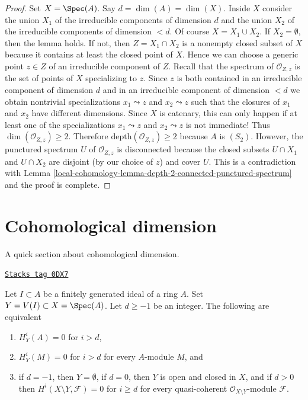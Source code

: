 \begin{proof}
Set $X = \Spec(A)$. Say $d = \dim(A) = \dim(X)$. Inside $X$ consider the
union $X_1$ of the irreducible components of dimension $d$ and the union
$X_2$ of the irreducible components of dimension $< d$. Of course
$X = X_1 \cup X_2$. If $X_2 = \emptyset$,
then the lemma holds. If not, then $Z = X_1 \cap X_2$ is a nonempty closed
subset of $X$ because it contains at least the closed point of $X$.
Hence we can choose a generic point $z \in Z$ of an irreducible component
of $Z$. Recall that the spectrum of $\mathcal{O}_{Z, z}$ is the set of points
of $X$ specializing to $z$. Since $z$ is both contained in an
irreducible component of dimension $d$ and in an irreducible component
of dimension $< d$ we obtain nontrivial specializations $x_1 \leadsto z$ and
$x_2 \leadsto z$ such that the closures of $x_1$ and $x_2$ have different
dimensions. Since $X$ is catenary, this can only happen if at least
one of the specializations $x_1 \leadsto z$ and $x_2 \leadsto z$ is not
immediate! Thus $\dim(\mathcal{O}_{Z, z}) \geq 2$. Therefore
$\text{depth}(\mathcal{O}_{Z, z}) \geq 2$ because $A$ is $(S_2)$.
However, the punctured spectrum $U$ of $\mathcal{O}_{Z, z}$ is disconnected
because the closed subsets $U \cap X_1$ and $U \cap X_2$ are disjoint
(by our choice of $z$) and cover $U$. This is a contradiction with
Lemma \ref{local-cohomology-lemma-depth-2-connected-punctured-spectrum}
and the proof is complete.
\end{proof}

\section{Cohomological dimension}
\label{local-cohomology-section-cd}
A quick section about cohomological dimension.

\begin{lemma}[Cd]
\label{local-cohomology-lemma-cd}
\href{https://stacks.math.columbia.edu/tag/0DX7}{\texttt{Stacks tag 0DX7}}

Let $I \subset A$ be a finitely generated ideal of a ring $A$.
Set $Y = V(I) \subset X = \Spec(A)$. Let $d \geq -1$ be an integer.
The following are equivalent
\begin{enumerate}
\item $H^i_Y(A) = 0$ for $i > d$,
\item $H^i_Y(M) = 0$ for $i > d$ for every $A$-module $M$, and
\item if $d = -1$, then $Y = \emptyset$, if $d = 0$, then
$Y$ is open and closed in $X$, and if $d > 0$ then
$H^i(X \setminus Y, \mathcal{F}) = 0$ for $i \geq d$
for every quasi-coherent $\mathcal{O}_{X \setminus Y}$-module $\mathcal{F}$.
\end{enumerate}
\end{lemma}

